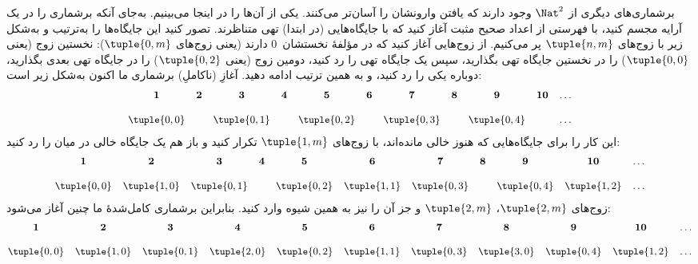 \documentclass[../../../include/open-logic-section]{subfiles}
\begin{document}


\begin{explain}
برشماری‌های دیگری از $\Nat^2$ وجود دارند که یافتن وارونشان را آسان‌تر
می‌کنند. یکی از آن‌ها را در اینجا می‌بینیم. به‌جای آنکه برشماری را در
یک آرایه مجسم کنید، با فهرستی از اعداد صحیح مثبت آغاز کنید که با
جایگاه‌هایی (در ابتدا) تهی متناظرند. تصور کنید این جایگاه‌ها را به‌ترتیب
و به‌شکل زیر با زوج‌های $\tuple{n,m}$ پر می‌کنیم. از زوج‌هایی آغاز کنید
که در مؤلفهٔ نخستشان~$0$ دارند (یعنی زوج‌های $\tuple{0,m}$): نخستین زوج
(یعنی $\tuple{0,0}$) را در نخستین جایگاه تهی بگذارید، سپس یک جایگاه تهی
را رد کنید، دومین زوج (یعنی $\tuple{0,2}$) را در جایگاه تهی بعدی بگذارید،
دوباره یکی را رد کنید، و به همین ترتیب ادامه دهید. آغازِ (ناکاملِ)
برشماری ما اکنون به‌شکل زیر است:
\[\small
\begin{array}{@{}c c c c c c c c c c c@{}}
\mathbf 1 & \mathbf 2 & \mathbf 3 & \mathbf 4 & \mathbf 5 & \mathbf 6 & \mathbf 7 & \mathbf 8 & \mathbf 9 & \mathbf{10} & \dots \\ \\
\tuple{0,0} &  & \tuple{0,1} &  & \tuple{0,2} &  & \tuple{0,3} & & \tuple{0,4} &  & \dots \\
\end{array}
\]
این کار را برای جایگاه‌هایی که هنوز خالی مانده‌اند، با زوج‌های
$\tuple{1,m}$ تکرار کنید و باز هم یک جایگاه خالی در میان را رد کنید:
\[\small
\begin{array}{@{}c c c c c c c c c c c@{}}
\mathbf 1 & \mathbf 2 & \mathbf 3 & \mathbf 4 & \mathbf 5 & \mathbf 6 & \mathbf 7 & \mathbf 8 & \mathbf 9 & \mathbf{10} & \dots \\ \\
\tuple{0,0} & \tuple{1,0} & \tuple{0,1} &  & \tuple{0,2} & \tuple{1,1} &
\tuple{0,3} & & \tuple{0,4} &  \tuple{1,2} & \dots \\
\end{array}
\]
زوج‌های $\tuple{2,m}$، $\tuple{2,m}$ و جز آن را نیز به همین شیوه وارد
کنید. بنابراین برشماری کامل‌شدهٔ ما چنین آغاز می‌شود:
\[\small
\begin{array}{@{}cc c c c c c c c c c@{}}
\mathbf 1 & \mathbf 2 & \mathbf 3 & \mathbf 4 & \mathbf 5 & \mathbf 6 & \mathbf 7 & \mathbf 8 & \mathbf 9 & \mathbf{10} & \dots \\ \\
\tuple{0,0} & \tuple{1,0} & \tuple{0,1} & \tuple{2,0}  & \tuple{0,2} &
\tuple{1,1} & \tuple{0,3} & \tuple{3,0}  & \tuple{0,4} &  \tuple{1,2} & \dots \\

\end{array}\]
\end{explain}
\end{document}
